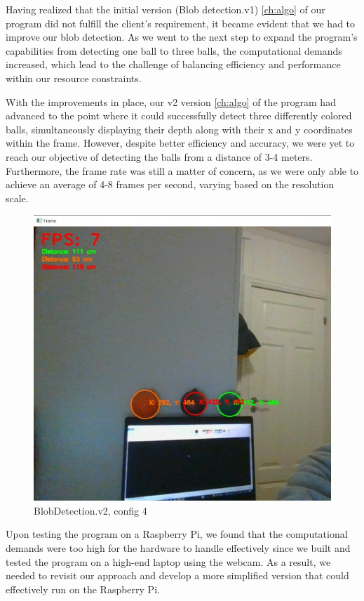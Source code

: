 Having realized that the initial version (Blob detection.v1) \ref{ch:algo} of our program did not fulfill the client's requirement, it became evident that we had to improve our blob detection. As we went to the next step to expand the program's capabilities from detecting one ball to three balls, the computational demands increased, which lead to the challenge of balancing efficiency and performance within our resource constraints.  

With the improvements in place, our v2 version \ref{ch:algo} of the program had advanced to the point where it could successfully detect three differently colored balls, simultaneously displaying their depth along with their x and y coordinates within the frame. However, despite better efficiency and accuracy, we were yet to reach our objective of detecting the balls from a distance of 3-4 meters. Furthermore, the frame rate was still a matter of concern, as we were only able to achieve an average of 4-8 frames per second, varying based on the resolution scale. 

\begin{figure}[H]
    \centering
    \includegraphics[scale=0.5]{fig/BlobDetection.v2.jpg}
    \caption{BlobDetection.v2, config 4}
    \label{fig:config4_v2}
\end{figure}

Upon testing the program on a Raspberry Pi, we found that the computational demands were too high for the hardware to handle effectively since we built and tested the program on a high-end laptop using the webcam.  As a result, we needed to revisit our approach and develop a more simplified version that could effectively run on the Raspberry Pi. 

